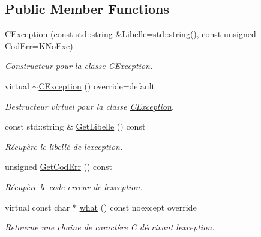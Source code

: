 \subsection*{Public Member Functions}
\begin{DoxyCompactItemize}
\item 
\hyperlink{classns_exception_1_1_c_exception_aeacba2e2180dd8c00c643e1a67cba423}{C\+Exception} (const std\+::string \&Libelle=std\+::string(), const unsigned Cod\+Err=\hyperlink{namespacens_exception_ae4cd0d6bbd5590a1b121347632d41376a0446a2a6f75ad46276a3c6bfbcf06eb3}{K\+No\+Exc})
\begin{DoxyCompactList}\small\item\em Constructeur pour la classe \hyperlink{classns_exception_1_1_c_exception}{C\+Exception}. \end{DoxyCompactList}\item 
virtual \hyperlink{classns_exception_1_1_c_exception_a8b95a8f59d50a7ff3b67423c83cb8501}{$\sim$\+C\+Exception} () override=default
\begin{DoxyCompactList}\small\item\em Destructeur virtuel pour la classe \hyperlink{classns_exception_1_1_c_exception}{C\+Exception}. \end{DoxyCompactList}\item 
const std\+::string \& \hyperlink{classns_exception_1_1_c_exception_aef8e3d1a4e22ec7045d7d0b14d8b968a}{Get\+Libelle} () const
\begin{DoxyCompactList}\small\item\em Récupère le libellé de l\textquotesingle{}exception. \end{DoxyCompactList}\item 
unsigned \hyperlink{classns_exception_1_1_c_exception_adf06d1598420c7b60c1b134bf2a946c2}{Get\+Cod\+Err} () const
\begin{DoxyCompactList}\small\item\em Récupère le code erreur de l\textquotesingle{}exception. \end{DoxyCompactList}\item 
virtual const char $\ast$ \hyperlink{classns_exception_1_1_c_exception_a5ef0ababcc3ffc93f70211de1122c9a8}{what} () const noexcept override
\begin{DoxyCompactList}\small\item\em Retourne une chaine de caractère C décrivant l\textquotesingle{}exception. \end{DoxyCompactList}\end{DoxyCompactItemize}
